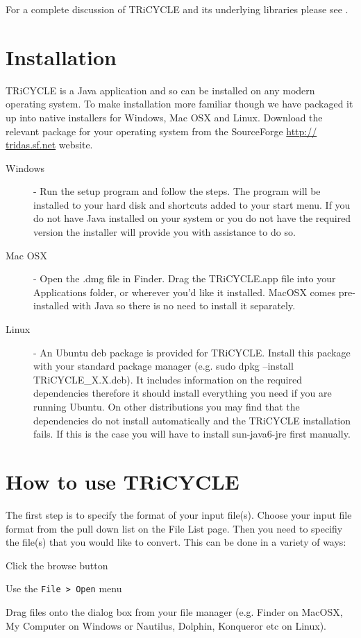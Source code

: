 \documentclass[10pt, headsepline,DIV14,BCOR0.5cm]{scrreprt}
\begin{document}
For a complete discussion of TRiCYCLE and its underlying libraries please see \citep{tricycle}.


\chapter{Installation}

TRiCYCLE is a Java application and so can be installed on any modern operating system. To make
installation more familiar though we have packaged it up into native installers for Windows, Mac OSX
and Linux. Download the relevant package for your operating system from the SourceForge \url{http://
tridas.sf.net} website.

\begin{description}
 \item[Windows] - Run the setup program and follow the steps. The program will be installed to your hard disk
and shortcuts added to your start menu. If you do not have Java installed on your system or
you do not have the required version the installer will provide you with assistance to do so.
 \item[Mac OSX] - Open the .dmg file in Finder. Drag the TRiCYCLE.app file into your Applications folder, or
wherever you'd like it installed. MacOSX comes pre-installed with Java so there is no need
to install it separately.
 \item[Linux] - An Ubuntu deb package is provided for TRiCYCLE. Install this package with your standard
package manager (e.g. sudo dpkg --install TRiCYCLE\_X.X.deb). It includes information
on the required dependencies therefore it should install everything you need if you are
running Ubuntu. On other distributions you may find that the dependencies do not install
automatically and the TRiCYCLE installation fails. If this is the case you will have to install
sun-java6-jre first manually.
\end{description}


\chapter{How to use TRiCYCLE}

The first step is to specify the format of your input file(s). Choose your input file format from the pull
down list on the File List page. Then you need to specifiy the file(s) that you would like to convert. This
can be done in a variety of ways:

\begin{itemize*}
 \item Click the browse button
 \item Use the \verb|File > Open| menu
 \item Drag files onto the dialog box from your file manager (e.g. Finder on MacOSX, My Computer on
Windows or Nautilus, Dolphin, Konqueror etc on Linux).
\end{itemize*}
\end{document}
